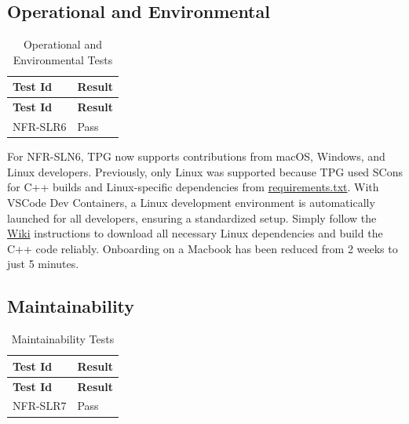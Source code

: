 \documentclass[12pt, titlepage]{article}
\begin{document}
\subsection{Operational and Environmental}\label{operational}

\begin{center}
  \begin{longtable}{|p{4cm}|p{4cm}|}
  \caption{Operational and Environmental Tests} \\
  \hline
  \textbf{Test Id} & \textbf{Result} \\
  \hline
  \endfirsthead
  \hline
  \textbf{Test Id} & \textbf{Result} \\
  \hline
  \endhead
  NFR-SLR6 & Pass \\
  \hline
  \end{longtable}
\end{center}

For NFR-SLN6, TPG now supports contributions from macOS, Windows, and Linux developers.
Previously, only Linux was supported because TPG used SCons for C++ builds and Linux-specific dependencies from \href{https://gitlab.cas.mcmaster.ca/kellys32/tpg/-/blob/main/requirements.txt}{requirements.txt}.
With VSCode Dev Containers, a Linux development environment is automatically launched for all developers, ensuring a standardized setup.
Simply follow the \href{https://gitlab.cas.mcmaster.ca/kellys32/tpg/-/wikis/home}{Wiki} instructions to download all necessary Linux dependencies and build the C++ code reliably. Onboarding on a Macbook has been reduced from 2 weeks to just 5 minutes.


\subsection{Maintainability}

  \begin{center}
  \begin{longtable}{|p{4cm}|p{4cm}|}
  \caption{Maintainability Tests} \\
  \hline
  \textbf{Test Id} & \textbf{Result} \\
  \hline
  \endfirsthead
  \hline
  \textbf{Test Id} & \textbf{Result} \\
  \hline
  \endhead
  NFR-SLR7 & Pass \\
  \hline
  \end{longtable}
\end{center}
\end{document}
